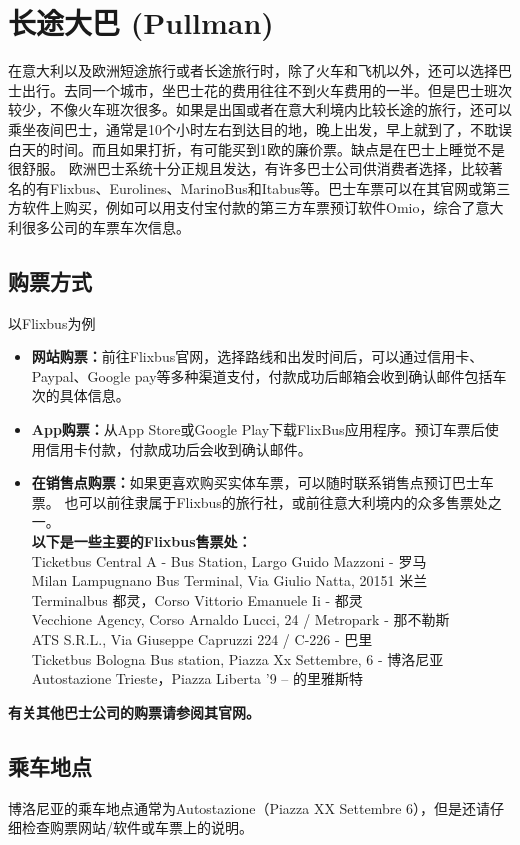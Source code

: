 \section{长途大巴 (Pullman)}
在意大利以及欧洲短途旅行或者长途旅行时，除了火车和飞机以外，还可以选择巴士出行。去同一个城市，坐巴士花的费用往往不到火车费用的一半。但是巴士班次较少，不像火车班次很多。如果是出国或者在意大利境内比较长途的旅行，还可以乘坐夜间巴士，通常是10个小时左右到达目的地，晚上出发，早上就到了，不耽误白天的时间。而且如果打折，有可能买到1欧的廉价票。缺点是在巴士上睡觉不是很舒服。
欧洲巴士系统十分正规且发达，有许多巴士公司供消费者选择，比较著名的有Flixbus、Eurolines、MarinoBus和Itabus等。巴士车票可以在其官网或第三方软件上购买，例如可以用支付宝付款的第三方车票预订软件Omio，综合了意大利很多公司的车票车次信息。
\subsection{购票方式}
以Flixbus为例
\begin{itemize}
\item  \textbf{网站购票：}前往Flixbus官网，选择路线和出发时间后，可以通过信用卡、Paypal、Google pay等多种渠道支付，付款成功后邮箱会收到确认邮件包括车次的具体信息。
\item  \textbf{App购票：}从App Store或Google Play下载FlixBus应用程序。预订车票后使用信用卡付款，付款成功后会收到确认邮件。
\item  \textbf{在销售点购票：}如果更喜欢购买实体车票，可以随时联系销售点预订巴士车票。 也可以前往隶属于Flixbus的旅行社，或前往意大利境内的众多售票处之一。\\
\textbf{以下是一些主要的Flixbus售票处：}\\
Ticketbus Central A - Bus Station, Largo Guido Mazzoni - 罗马\\
Milan Lampugnano Bus Terminal, Via Giulio Natta, 20151 米兰\\
Terminalbus 都灵，Corso Vittorio Emanuele Ii - 都灵\\
Vecchione Agency, Corso Arnaldo Lucci, 24 / Metropark - 那不勒斯\\
ATS S.R.L., Via Giuseppe Capruzzi 224 / C-226 - 巴里\\
Ticketbus Bologna Bus station, Piazza Xx Settembre, 6 - 博洛尼亚\\
Autostazione Trieste，Piazza Liberta '9 – 的里雅斯特\\
\end{itemize}
\textbf{有关其他巴士公司的购票请参阅其官网。}\\
\subsection{乘车地点}
博洛尼亚的乘车地点通常为Autostazione（Piazza XX Settembre 6），但是还请仔细检查购票网站/软件或车票上的说明。

